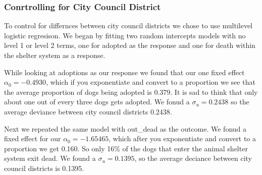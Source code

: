 \documentclass[]{article}
\newenvironment{Shaded}{\begin{snugshade}}{\end{snugshade}}
\newcommand{\KeywordTok}[1]{\textcolor[rgb]{0.13,0.29,0.53}{\textbf{#1}}}
\newcommand{\DataTypeTok}[1]{\textcolor[rgb]{0.13,0.29,0.53}{#1}}
\newcommand{\DecValTok}[1]{\textcolor[rgb]{0.00,0.00,0.81}{#1}}
\newcommand{\CharTok}[1]{\textcolor[rgb]{0.31,0.60,0.02}{#1}}
\newcommand{\StringTok}[1]{\textcolor[rgb]{0.31,0.60,0.02}{#1}}
\newcommand{\OtherTok}[1]{\textcolor[rgb]{0.56,0.35,0.01}{#1}}
\newcommand{\NormalTok}[1]{#1}
\begin{document}
\subsubsection{Conrtrolling for City Council
District}\label{conrtrolling-for-city-council-district}

To control for differnces between city council districts we chose to use
multilevel logistic regresison. We began by fitting two random
intercepts models with no level 1 or level 2 terms, one for adopted as
the response and one for death within the shelter system as a response.

While looking at adoptions as our response we found that our one fixed
effect \(\alpha_0=-0.4930\), which if you exponentiate and convert to a
proportion we see that the average proportion of dogs being adopted is
0.379. It is sad to think that only about one out of every three dogs
gets adopted. We fonud a \(\sigma_u=0.2438\) so the average deviance
between city council districts 0.2438.

Next we repeated the same model with out\_dead as the outcome. We fonud
a fixed effect for our \(\alpha_0=-1.65465\), which after you
exponentiate and convert to a proportion we get 0.160. So only 16\% of
the dogs that enter the animal shelter system exit dead. We found a
\(\sigma_u=0.1395\), so the average deciance between city council
districts is 0.1395.

\begin{Shaded}
\end{Shaded}
\end{document}
